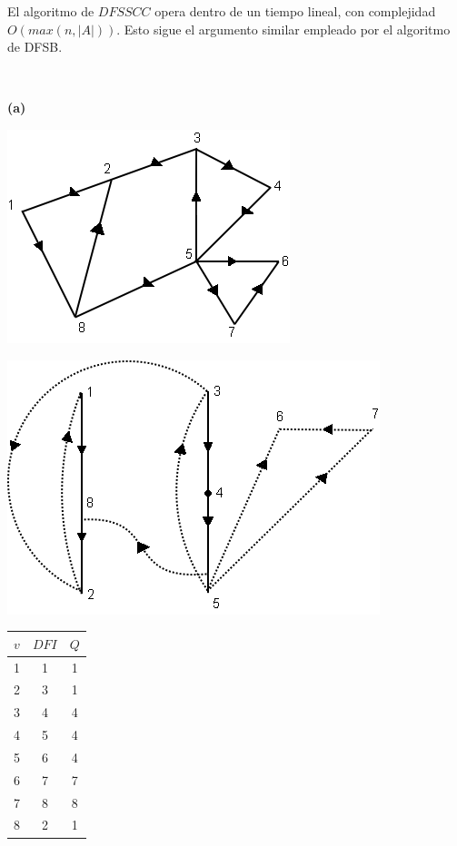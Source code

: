\documentclass[10pt,a5paper]{book}
\begin{document}
El algoritmo de $DFSSCC$ opera dentro de un tiempo lineal, con complejidad $O(max(n,|A|))$. Esto sigue el argumento similar empleado por el algoritmo de DFSB.
\vfill
\nopagebreak
\begin{figure}[H]
\caption{ }
\end{figure}
\hrulefill{}\\
\begin{center}
\parbox{1cm}
{
  \begin{flushleft}\textbf{(a)}\end{flushleft}
  \includegraphics[scale=0.4]{Fig1_21_a1.png}
}\hfill
\parbox{5cm}
{
  \includegraphics[scale=0.42]{Fig1_21_a2.png}
}\hfill

\parbox{4cm}
{
  \begin{flushright}
  \begin{tabular}{|c|c|c|}
  \hline
  $v$ & $DFI$ & $Q$\\
  \hline
  1 & 1 & 1 \\
  \hline
  2 & 3 & 1 \\
  \hline
  3 & 4 & 4 \\
  \hline
  4 & 5 & 4 \\
  \hline
  5 & 6 & 4 \\
  \hline
  6 & 7 & 7 \\
  \hline
  7 & 8 & 8 \\
  \hline
  8 & 2 & 1 \\
  \hline
\end{tabular}
\end{flushright}
}\\
\end{center}
\end{document}
